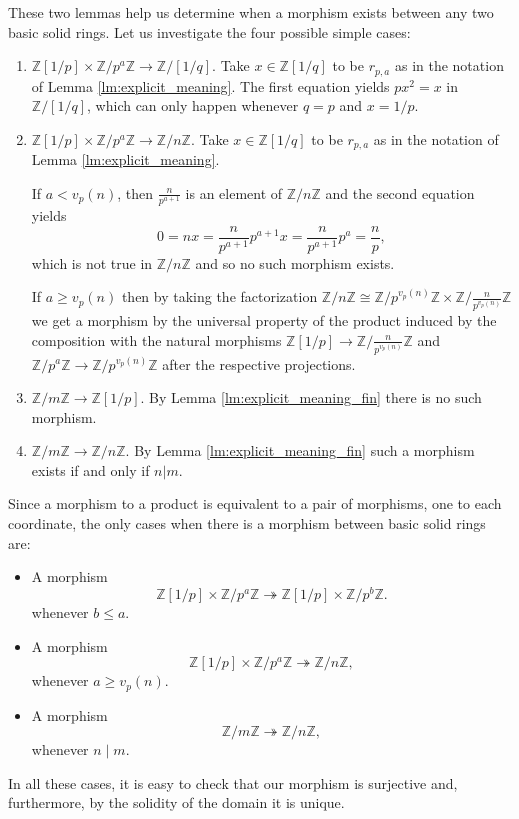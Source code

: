 \documentclass{amsart}
\newcommand{\Z}{{\mathbb Z}}
\begin{document}
    These two lemmas help us determine when a morphism exists between any two basic solid rings.
    Let us investigate the four possible simple cases:\\

    \begin{enumerate}
        \item $\Z[1/p] \times \Z/p^{a}\Z \to \Z/[1/q]$.
        Take $x \in \Z[1/q]$ to be $r_{p,a}$ as in the notation of Lemma \ref{lm:explicit_meaning}.
        The first equation yields $px^2 = x$ in $\Z/[1/q]$, which can only happen whenever $q = p$ and $x = 1/p$.\\

        \item $\Z[1/p] \times \Z/p^{a}\Z \to \Z/n\Z$.
        Take $x \in \Z[1/q]$ to be $r_{p,a}$ as in the notation of Lemma \ref{lm:explicit_meaning}.
        
        If $a < v_p(n)$, then $\frac{n}{p^{a+1}}$ is an element of $\Z/n\Z$ and the second equation yields
        $$
        0 = nx = \frac{n}{p^{a+1}} p^{a+1} x = \frac{n}{p^{a+1}} p^a = \frac{n}{p},
        $$
        which is not true in $\Z/n\Z$ and so no such morphism exists.

        If $a \geq v_p(n)$ then by taking the factorization $\Z/n\Z \cong \Z/p^{v_p(n)}\Z \times \Z/\frac{n}{p^{v_p(n)}}\Z$ we get a morphism by the universal property of the product induced by the composition with the natural morphisms $\Z[1/p] \to \Z/\frac{n}{p^{v_p(n)}}\Z$ and $\Z/p^a\Z \to \Z/p^{v_p(n)}\Z$ after the respective projections.
        
        \item $\Z/m\Z \to \Z[1/p]$. By Lemma \ref{lm:explicit_meaning_fin} there is no such morphism.

        \item $\Z/m\Z \to \Z/n\Z$. By Lemma \ref{lm:explicit_meaning_fin} such a morphism exists if and only if $n | m$.\\
    \end{enumerate}

    Since a morphism to a product is equivalent to a pair of morphisms, one to each coordinate, the only cases when there is a morphism between basic solid rings are:

    \begin{itemize}
        \item A morphism
            \[
    \tag{3.A}\label{S1}
    \Z[1/p] \times \Z/p^{a}\Z \twoheadrightarrow \Z[1/p] \times \Z/p^{b}\Z.
    \]
        whenever $b \leq a$.
        
        \item A morphism
    \[
    \tag{3.B}\label{S2}
    \Z[1/p] \times \Z/p^{a}\Z \twoheadrightarrow \Z/n\Z,
    \]
        whenever $a \geq v_p(n)$.

        \item A morphism
    \[
    \tag{3.C}\label{S3}
    \Z/m\Z \twoheadrightarrow \Z/n\Z,
    \]
        whenever $n \mid m$.
    \end{itemize}
    In all these cases, it is easy to check that our morphism is surjective and, furthermore, by the solidity of the domain it is unique.\\
\end{document}
